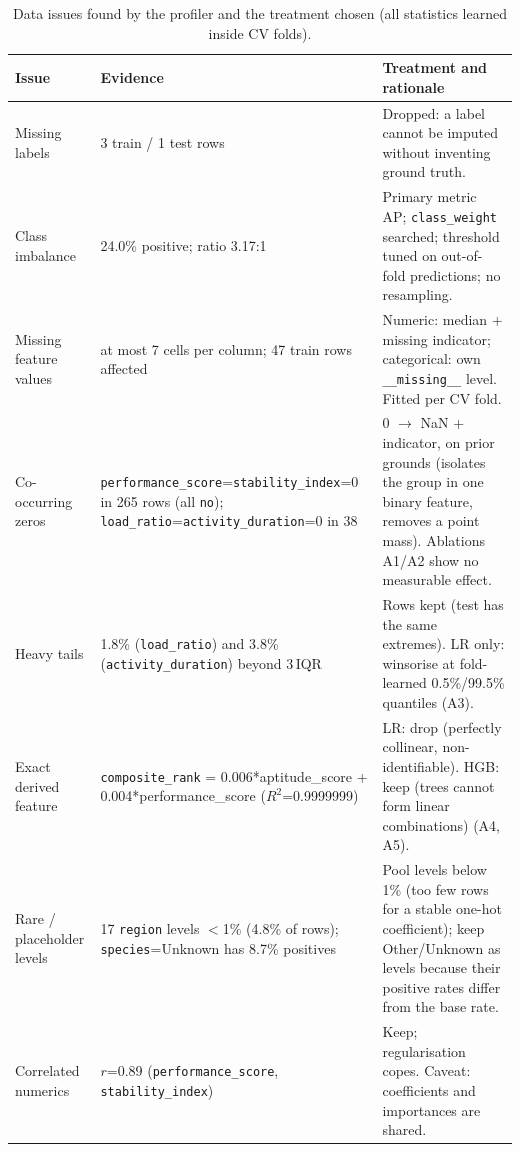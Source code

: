 \documentclass[10pt]{article}
\begin{document}
\begin{table}[!htb]\centering\footnotesize\setlength{\tabcolsep}{3pt}
\caption{Data issues found by the profiler and the treatment chosen (all statistics learned inside CV folds).}\label{tab:issues}
\begin{tabularx}{\linewidth}{>{\raggedright\arraybackslash}p{2.6cm} Y Y}\toprule
Issue & Evidence & Treatment and rationale\\\midrule
Missing labels & 3 train / 1 test rows & Dropped: a label cannot be imputed without inventing ground truth.\\
Class imbalance & 24.0\% positive; ratio 3.17:1 & Primary metric AP; \texttt{class\_weight} searched; threshold tuned on out-of-fold predictions; no resampling.\\
Missing feature values & at most 7 cells per column; 47 train rows affected & Numeric: median + missing indicator; categorical: own \texttt{\_\_missing\_\_} level. Fitted per CV fold.\\
Co-occurring zeros & \texttt{performance\_score}=\texttt{stability\_index}=0 in 265 rows (all \texttt{no}); \texttt{load\_ratio}=\texttt{activity\_duration}=0 in 38 & 0 $\to$ NaN + indicator, on prior grounds (isolates the group in one binary feature, removes a point mass). Ablations A1/A2 show no measurable effect.\\
Heavy tails & 1.8\% (\texttt{load\_ratio}) and 3.8\% (\texttt{activity\_duration}) beyond 3\,IQR & Rows kept (test has the same extremes). LR only: winsorise at fold-learned 0.5\%/99.5\% quantiles (A3).\\
Exact derived feature & \texttt{composite\_rank} = 0.006*aptitude\_score + 0.004*performance\_score ($R^2$=0.9999999) & LR: drop (perfectly collinear, non-identifiable). HGB: keep (trees cannot form linear combinations) (A4, A5).\\
Rare / placeholder levels & 17 \texttt{region} levels $<$1\% (4.8\% of rows); \texttt{species}=Unknown has 8.7\% positives & Pool levels below 1\% (too few rows for a stable one-hot coefficient); keep Other/Unknown as levels because their positive rates differ from the base rate.\\
Correlated numerics & $r$=0.89 (\texttt{performance\_score}, \texttt{stability\_index}) & Keep; regularisation copes. Caveat: coefficients and importances are shared.\\
\bottomrule\end{tabularx}\end{table}
\end{document}
